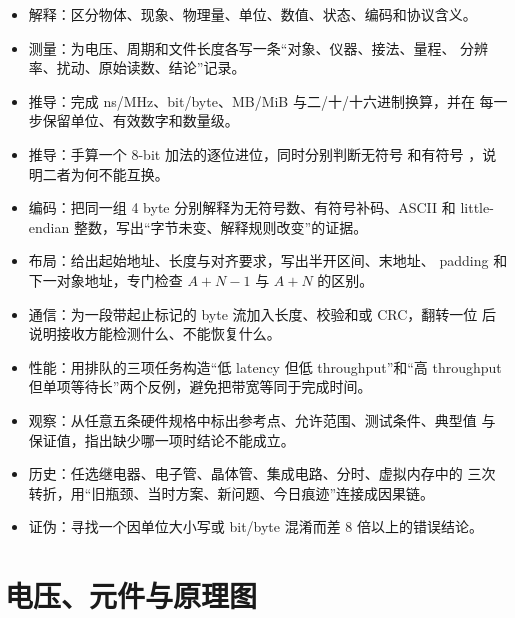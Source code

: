 \begin{itemize}
  \item 解释：区分物体、现象、物理量、单位、数值、状态、编码和协议含义。
  \item 测量：为电压、周期和文件长度各写一条“对象、仪器、接法、量程、
        分辨率、扰动、原始读数、结论”记录。
  \item 推导：完成 ns/MHz、bit/byte、MB/MiB 与二/十/十六进制换算，并在
        每一步保留单位、有效数字和数量级。
  \item 推导：手算一个 8-bit 加法的逐位进位，同时分别判断无符号
         和有符号 ，说明二者为何不能互换。
  \item 编码：把同一组 4 byte 分别解释为无符号数、有符号补码、ASCII 和
        little-endian 整数，写出“字节未变、解释规则改变”的证据。
  \item 布局：给出起始地址、长度与对齐要求，写出半开区间、末地址、
        padding 和下一对象地址，专门检查 \(A+N-1\) 与 \(A+N\) 的区别。
  \item 通信：为一段带起止标记的 byte 流加入长度、校验和或 CRC，翻转一位
        后说明接收方能检测什么、不能恢复什么。
  \item 性能：用排队的三项任务构造“低 latency 但低 throughput”和“高
        throughput 但单项等待长”两个反例，避免把带宽等同于完成时间。
  \item 观察：从任意五条硬件规格中标出参考点、允许范围、测试条件、典型值
        与保证值，指出缺少哪一项时结论不能成立。
  \item 历史：任选继电器、电子管、晶体管、集成电路、分时、虚拟内存中的
        三次转折，用“旧瓶颈、当时方案、新问题、今日痕迹”连接成因果链。
  \item 证伪：寻找一个因单位大小写或 bit/byte 混淆而差 \(8\) 倍以上的错误结论。
\end{itemize}

\section*{电压、元件与原理图}

